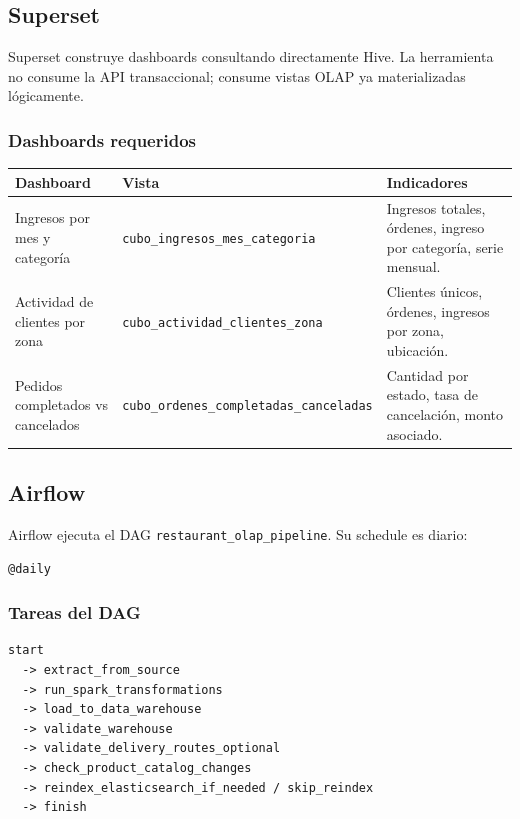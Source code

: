 \documentclass[12pt,letterpaper]{article}
\def\codefile#1{\nolinkurl{#1}}
\begin{document}
\subsection{Superset}

Superset construye dashboards consultando directamente Hive. La herramienta no consume la API transaccional; consume vistas OLAP ya materializadas lógicamente.

\subsubsection{Dashboards requeridos}

\begin{longtable}{p{}p{}p{}}
\toprule
\textbf{Dashboard} & \textbf{Vista} & \textbf{Indicadores}\\
\midrule
Ingresos por mes y categoría & \codefile{cubo\_ingresos\_mes\_categoria} & Ingresos totales, órdenes, ingreso por categoría, serie mensual.\\
Actividad de clientes por zona & \codefile{cubo\_actividad\_clientes\_zona} & Clientes únicos, órdenes, ingresos por zona, ubicación.\\
Pedidos completados vs cancelados & \codefile{cubo\_ordenes\_completadas\_canceladas} & Cantidad por estado, tasa de cancelación, monto asociado.\\
\bottomrule
\end{longtable}

\subsection{Airflow}

Airflow ejecuta el DAG \codefile{restaurant\_olap\_pipeline}. Su schedule es diario:

\begin{lstlisting}
@daily
\end{lstlisting}

\subsubsection{Tareas del DAG}

\begin{lstlisting}
start
  -> extract_from_source
  -> run_spark_transformations
  -> load_to_data_warehouse
  -> validate_warehouse
  -> validate_delivery_routes_optional
  -> check_product_catalog_changes
  -> reindex_elasticsearch_if_needed / skip_reindex
  -> finish
\end{lstlisting}
\end{document}
